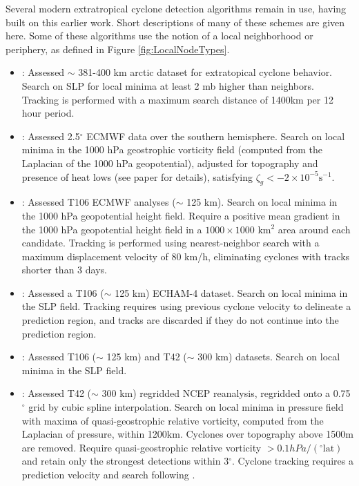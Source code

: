 \documentclass[gmdd, hvmath, online]{copernicus_discussions}
\begin{document}
Several modern extratropical cyclone detection algorithms remain in use, having built on this earlier work.  Short descriptions of many of these schemes are given here.  Some of these algorithms use the notion of a local neighborhood or periphery, as defined in Figure \ref{fig:LocalNodeTypes}.

\begin{itemize}
\item \cite{serreze1993characteristics, serreze1995climatological}:  Assessed $\sim$ 381-400 km arctic dataset for extratopical cyclone behavior.  Search on SLP for local minima at least 2 mb higher than neighbors.  Tracking is performed with a maximum search distance of 1400km per 12 hour period.

\item \cite{sinclair1994objective, sinclair1997objective}:  Assessed 2.5$^\circ$ ECMWF data over the southern hemisphere.  Search on local minima in the 1000 hPa geostrophic vorticity field (computed from the Laplacian of the 1000 hPa geopotential), adjusted for topography and presence of heat lows (see paper for details), satisfying $\zeta_g < -2 \times 10^{-5} \mbox{s}^{-1}$.

\item \cite{blender1997identification}:  Assessed T106 ECMWF analyses ($\sim$ 125 km).  Search on local minima in the 1000 hPa geopotential height field.  Require a positive mean gradient in the 1000 hPa geopotential height field in a $1000 \times 1000$ km$^2$ area around each candidate.  Tracking is performed using nearest-neighbor search with a maximum displacement velocity of 80 km/h, eliminating cyclones with tracks shorter than 3 days.

\item \cite{lionello2002cyclones}:  Assessed a T106 ($\sim$ 125 km) ECHAM-4 dataset.  Search on local minima in the SLP field.  Tracking requires using previous cyclone velocity to delineate a prediction region, and tracks are discarded if they do not continue into the prediction region.

\item \cite{zolina2002improving}:  Assessed T106 ($\sim$ 125 km) and T42 ($\sim$ 300 km) datasets.  Search on local minima in the SLP field.

\item \cite{pinto2005sensitivities}:  Assessed T42 ($\sim$ 300 km) regridded NCEP reanalysis, regridded onto a 0.75$^\circ$ grid by cubic spline interpolation.  Search on local minima in pressure field with maxima of quasi-geostrophic relative vorticity, computed from the Laplacian of pressure, within 1200km.  Cyclones over topography above 1500m are removed.  Require quasi-geostrophic relative vorticity $> 0.1 hPa / (^\circ \mbox{lat})$ and retain only the strongest detections within 3$^\circ$.  Cyclone tracking requires a prediction velocity and search following \cite{murray1991numerical}.


\end{itemize}
\end{document}

